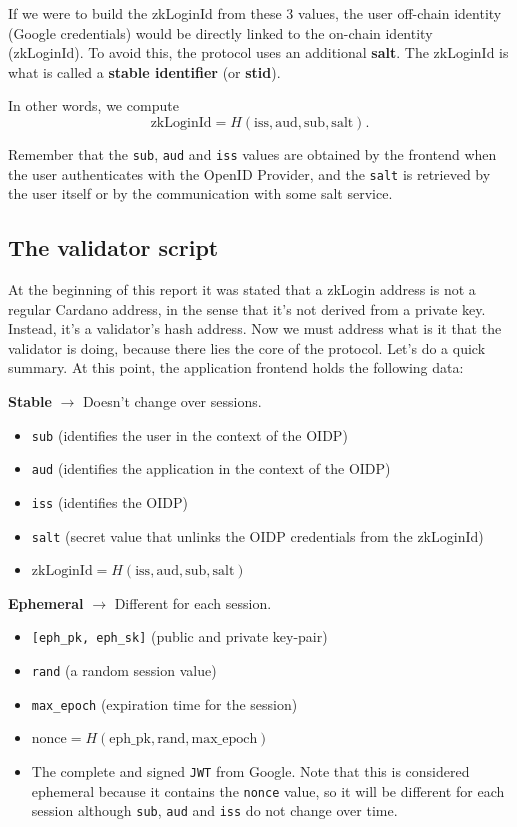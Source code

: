 \documentclass{article}
\begin{document}
If we were to build the zkLoginId from these 3 values, the user off-chain identity (Google credentials) would be directly linked to the on-chain identity (zkLoginId). To avoid this, the protocol uses an additional \textbf{salt}. The zkLoginId is what is called a \textbf{stable identifier} (or \textbf{stid}).

In other words, we compute
\[
    \text{zkLoginId} = H(\text{iss}, \text{aud}, \text{sub}, \text{salt}).
\]

Remember that the \texttt{sub}, \texttt{aud} and \texttt{iss} values are obtained by the frontend when the user authenticates with the OpenID Provider, and the \texttt{salt} is retrieved by the user itself or by the communication with some salt service.

\subsection{The validator script}

At the beginning of this report it was stated that a zkLogin address is not a regular Cardano address, in the sense that it's not derived from a private key. Instead, it's a validator's hash address. Now we must address what is it that the validator is doing, because there lies the core of the protocol. Let's do a quick summary. At this point, the application frontend holds the following data:

\textbf{Stable} $\rightarrow$ Doesn't change over sessions.
\begin{itemize}
    \item \texttt{sub} (identifies the user in the context of the OIDP)
    \item \texttt{aud} (identifies the application in the context of the OIDP)
    \item \texttt{iss} (identifies the OIDP)
    \item \texttt{salt} (secret value that unlinks the OIDP credentials from the zkLoginId)
    \item $\text{zkLoginId} = H(\text{iss}, \text{aud}, \text{sub}, \text{salt})$
\end{itemize}

\textbf{Ephemeral} $\rightarrow$ Different for each session.
\begin{itemize}
    \item \texttt{[eph\_pk, eph\_sk]} (public and private key-pair)
    \item \texttt{rand} (a random session value)
    \item \texttt{max\_epoch} (expiration time for the session)
    \item $\text{nonce} = H(\text{eph\_pk}, \text{rand}, \text{max\_epoch})$
    \item The complete and signed \texttt{JWT} from Google. Note that this is considered ephemeral because it contains the \texttt{nonce} value, so it will be different for each session although \texttt{sub}, \texttt{aud} and \texttt{iss} do not change over time.
\end{itemize}
\end{document}
